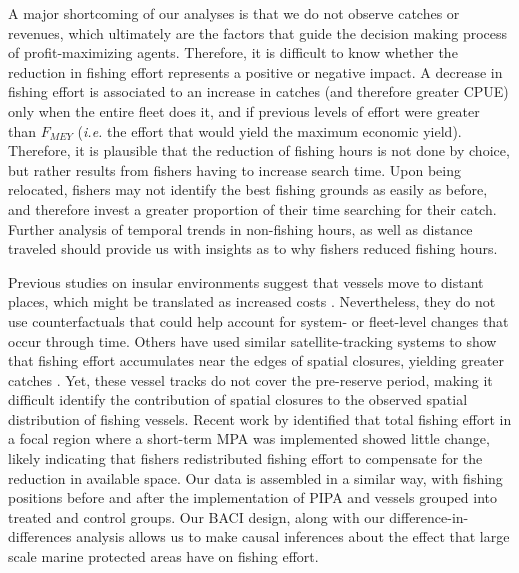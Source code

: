 \documentclass[12pt,]{article}
\begin{document}
A major shortcoming of our analyses is that we do not observe catches or
revenues, which ultimately are the factors that guide the decision
making process of profit-maximizing agents. Therefore, it is difficult
to know whether the reduction in fishing effort represents a positive or
negative impact. A decrease in fishing effort is associated to an
increase in catches (and therefore greater CPUE) only when the entire
fleet does it, and if previous levels of effort were greater than
\(F_{MEY}\) (\emph{i.e.} the effort that would yield the maximum
economic yield). Therefore, it is plausible that the reduction of
fishing hours is not done by choice, but rather results from fishers
having to increase search time. Upon being relocated, fishers may not
identify the best fishing grounds as easily as before, and therefore
invest a greater proportion of their time searching for their catch.
Further analysis of temporal trends in non-fishing hours, as well as
distance traveled should provide us with insights as to why fishers
reduced fishing hours.

Previous studies on insular environments suggest that vessels move to
distant places, which might be translated as increased costs
\citep{stevenson_2013}. Nevertheless, they do not use counterfactuals
that could help account for system- or fleet-level changes that occur
through time. Others have used similar satellite-tracking systems to
show that fishing effort accumulates near the edges of spatial closures,
yielding greater catches \citep{murawski_2005}. Yet, these vessel tracks
do not cover the pre-reserve period, making it difficult identify the
contribution of spatial closures to the observed spatial distribution of
fishing vessels. Recent work by \citet{elahi_2018} identified that total
fishing effort in a focal region where a short-term MPA was implemented
showed little change, likely indicating that fishers redistributed
fishing effort to compensate for the reduction in available space. Our
data is assembled in a similar way, with fishing positions before and
after the implementation of PIPA and vessels grouped into treated and
control groups. Our BACI design, along with our
difference-in-differences analysis allows us to make causal inferences
about the effect that large scale marine protected areas have on fishing
effort.
\end{document}
